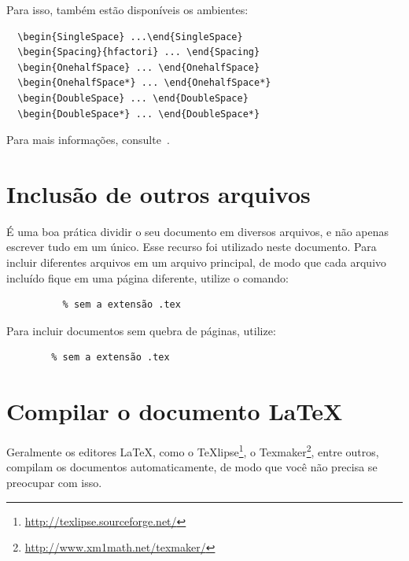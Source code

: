 Para isso, também estão disponíveis os ambientes:

\begin{verbatim}
  \begin{SingleSpace} ...\end{SingleSpace}
  \begin{Spacing}{hfactori} ... \end{Spacing}
  \begin{OnehalfSpace} ... \end{OnehalfSpace}
  \begin{OnehalfSpace*} ... \end{OnehalfSpace*}
  \begin{DoubleSpace} ... \end{DoubleSpace}
  \begin{DoubleSpace*} ... \end{DoubleSpace*}
\end{verbatim}

Para mais informações, consulte~.

\section{Inclusão de outros arquivos}%
\label{sec-include}

É uma boa prática dividir o seu documento em diversos arquivos, e não
apenas escrever tudo em um único. Esse recurso foi utilizado neste
documento. Para incluir diferentes arquivos em um arquivo principal,
de modo que cada arquivo incluído fique em uma página diferente, utilize o
comando:

\begin{verbatim}
          % sem a extensão .tex
\end{verbatim}

Para incluir documentos sem quebra de páginas, utilize:

\begin{verbatim}
        % sem a extensão .tex
\end{verbatim}

\section{Compilar o documento \LaTeX}

Geralmente os editores \LaTeX, como o
TeXlipse\footnote{\url{http://texlipse.sourceforge.net/}}, o
Texmaker\footnote{\url{http://www.xm1math.net/texmaker/}}, entre outros,
compilam os documentos automaticamente, de modo que você não precisa se
preocupar com isso.

